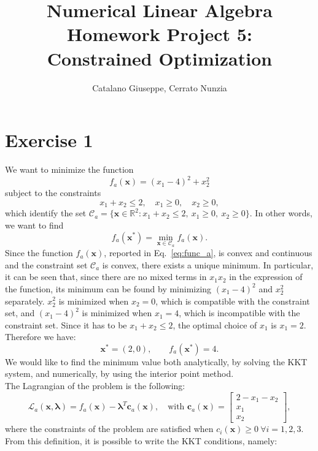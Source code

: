\documentclass[a4paper,11pt]{article}
\newcommand{\R}{\mathbb{R}}
\begin{document}
	\author{Catalano Giuseppe, Cerrato Nunzia}
	\title{Numerical Linear Algebra Homework Project 5:\\Constrained Optimization}
	\date{}
	\maketitle

\section*{Exercise 1}
We want to minimize the function
\begin{equation}
	f_a(\textbf{x}) = (x_{1}-4)^2 + x_{2}^{2}
	\label{eq:func_a}
\end{equation}
subject to the constraints
\begin{equation}
	x_{1} + x_{2} \le 2, \quad x_{1} \ge 0, \quad x_{2} \ge 0,
	\label{eq:constr_a}
\end{equation}
which identify the set $\mathcal{C}_a = \{ \textbf{x} \in \R^2 : x_{1} + x_{2} \le 2, \ x_{1} \ge 0, \ x_{2} \ge 0 \}$. In other words, we want to find 
\begin{equation}
	f_a(\textbf{x}^*) = \min_{\textbf{x} \in \mathcal{C}_a} f_a(\textbf{x}).
\end{equation}
\noindent Since the function $f_a(\textbf{x})$, reported in Eq.~\eqref{eq:func_a}, is convex and continuous and the constraint set $\mathcal{C}_a$ is convex, there exists a unique minimum. In particular, it can be seen that, since there are no mixed terms in $x_1 x_2$ in the expression of the function, its minimum can be found by minimizing $(x_{1}-4)^2$ and $x_{2}^{2}$ separately. $x_{2}^{2}$ is minimized when $x_{2} = 0$, which is compatible with the constraint set, and $(x_{1}-4)^2$ is minimized when $ x_{1} = 4$, which is incompatible with the constraint set. Since it has to be $x_{1} + x_{2} \le 2$, the optimal choice of $x_1$ is $x_1 = 2$. Therefore we have:
\begin{equation}
	\textbf{x}^* = (2,0),\qquad  f_a(\textbf{x}^*) = 4.
\end{equation}
\noindent We would like to find the minimum value both analytically, by solving the KKT system, and numerically, by using the interior point method.\\

\noindent The Lagrangian of the problem is the following:
\begin{equation}
	\mathcal{L}_a(\textbf{x},\boldsymbol{\lambda}) = f_a(\textbf{x}) - \boldsymbol{\lambda}^T \textbf{c}_a(\textbf{x}), \quad \text{with } \textbf{c}_a(\textbf{x}) = \begin{bmatrix}
		2 - x_1 - x_2\\
		x_1\\
		x_2
	\end{bmatrix},
\end{equation}
where the constraints of the problem are satisfied when $c_i(\textbf{x})\ge 0\ \forall i = 1,2,3$. From this definition, it is possible to write the KKT conditions, namely:
 
\end{document}
